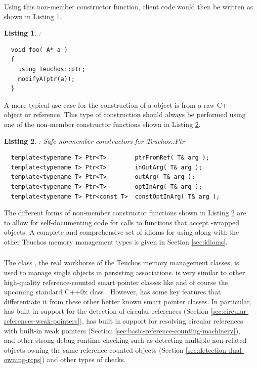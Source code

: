\documentclass[pdf,ps2pdf,11pt]{SANDreport}
\newtheorem{listing}{Listing}
\begin{document}
Using this non-member constructor function, client code would then be
written as shown in Listing {}\ref{listing:using-ptr}.

\begin{listing}:\\
\label{listing:using-ptr}
{\small\begin{verbatim}
  void foo( A* a )
  {
    using Teuchos::ptr;
    modifyA(ptr(a));
  }
\end{verbatim}}
\end{listing}

A more typical use case for the construction of a {} object is from a
raw C++ object or reference.  This type of construction should always be
performed using one of the non-member constructor functions shown in Listing
{}\ref{listing:ptr-from-ref-nonmember-constructors}.

\begin{listing}: Safe nonmember constructors for Teuchos::Ptr\\
\label{listing:ptr-from-ref-nonmember-constructors}
{\small\begin{verbatim}
  template<typename T> Ptr<T>        ptrFromRef( T& arg );
  template<typename T> Ptr<T>        inOutArg( T& arg );
  template<typename T> Ptr<T>        outArg( T& arg );
  template<typename T> Ptr<T>        optInArg( T& arg );
  template<typename T> Ptr<const T>  constOptInArg( T& arg );
\end{verbatim}}
\end{listing}

The different forms of non-member constructor functions shown in Listing
{}\ref{listing:ptr-from-ref-nonmember-constructors} are to allow for
self-documenting code for calls to functions that accept {}-wrapped
objects.  A complete and comprehensive set of idioms for using {}
along with the other Teuchos memory management types is given in Section
{}\ref{sec:idioms}.


%
{}\subsubsection{}
\label{sec:RCP}
%

The class {}, the real workhorse of the Teuchos memory management
classes, is used to manage single objects in persisting associations.
{} is very similar to other high-quality reference-counted smart
pointer classes like {} and of course the upcoming
standard C++0x class {}.  However, {} has some
key features that differentiate it from these other better known smart pointer
classes.  In particular, {} has built in support for the detection of
circular references (Section {}\ref{sec:circular-references-weak-pointers}),
has built in support for resolving circular references with built-in weak
pointers (Section {}\ref{sec:basic-reference-counting-machinery}), and other
strong debug runtime checking such as detecting multiple non-related
{} objects owning the same reference-counted objects (Section
{}\ref{sec:detection-dual-owning-rcps}) and other types of checks.
\end{document}
